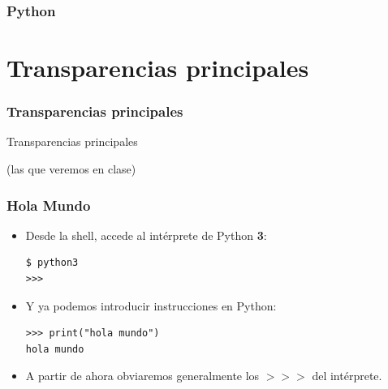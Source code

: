 \documentclass{beamer}
\begin{document}
\begin{frame}
\frametitle{Python}

\end{frame}
\usebackgroundtemplate{}


\section{Transparencias principales}

\begin{frame}
\frametitle{Transparencias principales}

\begin{center}
{\Huge Transparencias principales}

{\footnotesize (las que veremos en clase)}
\end{center}
\end{frame}


\begin{frame}[fragile]

\frametitle{Hola Mundo}

\begin{itemize}
\item Desde la shell, accede al intérprete de Python {\bf 3}:

\begin{footnotesize}
\begin{verbatim}
$ python3
>>>
\end{verbatim}
\end{footnotesize}
\item Y ya podemos introducir instrucciones en Python:

\begin{footnotesize}
\begin{verbatim}
>>> print("hola mundo")
hola mundo
\end{verbatim}
\end{footnotesize}

\item A partir de ahora obviaremos generalmente los $>>>$ del intérprete.

\end{itemize}

\end{frame}
\end{document}
